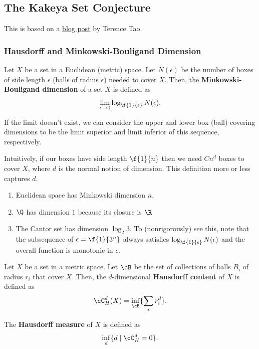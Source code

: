 \subsection{The Kakeya Set Conjecture}
This is based on a \href{https://terrytao.wordpress.com/2008/11/27/the-kakeya-conjecture-and-the-ham-sandwich-theorem/}{blog post} by Terence Tao. 

\subsubsection{Hausdorff and Minkowski-Bouligand Dimension}
\begin{definition}
    Let $X$ be a set in a Euclidean (metric) space. Let $N(\epsilon)$ be the number of boxes of side length $\epsilon$ (balls of radius $\epsilon$) needed to cover $X$. Then, the \textbf{Minkowski-Bouligand dimension} of a set $X$ is defined as
    \begin{equation}
        \lim_{\epsilon \rightarrow 0} \log_{\f{1}{\epsilon}} N(\epsilon).
    \end{equation}

    If the limit doesn't exist, we can consider the upper and lower box (ball) covering dimensions to be the limit superior and limit inferior of this sequence, respectively. 
\end{definition}

Intuitively, if our boxes have side length $\f{1}{n}$ then we need $Cn^d$ boxes to cover $X$, where $d$ is the normal notion of dimension. This definition more or less captures $d$. 

\begin{example}
    \begin{enumerate}
        \item Euclidean space has Minkowski dimension $n$.
        \item $\Q$ has dimension $1$ because its closure is $\R$
        \item The Cantor set has dimension $\log_2 3$. To (nonrigorously) see this, note that the subsequence of $\epsilon = \f{1}{3^n}$ always satisfies $\log_{\f{1}{\epsilon}} N(\epsilon)$ and the overall function is monotonic in $\epsilon$. 
    \end{enumerate}
\end{example}

\begin{definition}
    Let $X$ be a set in a metric space. Let $\cB$ be the set of collections of balls $B_i$ of radius $r_i$ that cover $X$. Then, the $d$-dimensional \textbf{Hausdorff content} of $X$ is defined as
    \begin{equation}
        \cC_H^d(X) = \inf_{\cB} \{\sum_i r_i^d\}.
    \end{equation}

    The \textbf{Hausdorff measure} of $X$ is defined as
    \begin{equation}
        \inf_d \{d \mid \cC_H^d = 0\}.
    \end{equation}
\end{definition}

